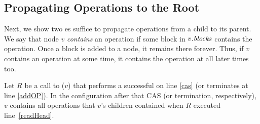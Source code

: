 \subsection{Propagating Operations to the Root}
\label{sec::propagating}

Next, we show two es suffice to propagate operations from a child to its parent.
We say that node $v$ \emph{contains} an operation if some block in $v.\mbox{\textit{blocks}}$ contains the operation.
Once a block is added to a node, it remains there forever.  Thus, if $v$ contains an operation at some time, it contains the operation at all later times too.

\begin{lemma}\label{successfulRefresh}
Let $R$ be a call to ($v$) that performs a successful  on line \ref{cas} (or terminates at line \ref{addOP}).
In the configuration after that CAS (or termination, respectively), $v$ contains all operations that $v$'s children contained 
when $R$ executed line~\ref{readHead}.
\end{lemma}
